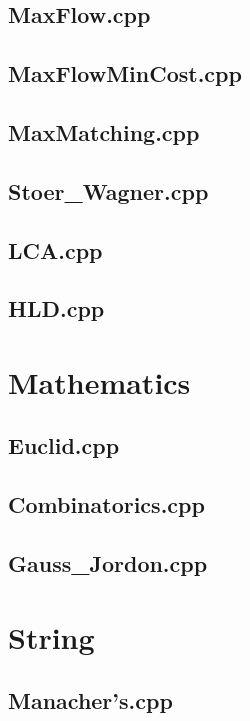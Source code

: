 \subsection{MaxFlow.cpp}

\subsection{MaxFlowMinCost.cpp}

\subsection{MaxMatching.cpp}

\subsection{Stoer\_Wagner.cpp}

\subsection{LCA.cpp}

\subsection{HLD.cpp}

\section{Mathematics}
\subsection{Euclid.cpp}

\subsection{Combinatorics.cpp}

\subsection{Gauss\_Jordon.cpp}

\section{String}
\subsection{Manacher's.cpp}


